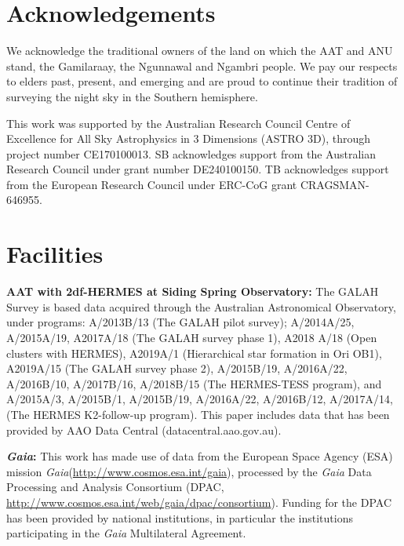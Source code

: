 \documentclass[fleqn,usenatbib]{mnras}
\newcommand{\Gaia}{\textit{Gaia}\xspace} %
\begin{document}

\section*{Acknowledgements}

We acknowledge the traditional owners of the land on which the AAT and ANU stand, the Gamilaraay, the Ngunnawal and Ngambri people. We pay our respects to elders past, present, and emerging and are proud to continue their tradition of surveying the night sky in the Southern hemisphere.

This work was supported by the Australian Research Council Centre of Excellence for All Sky Astrophysics in 3 Dimensions (ASTRO 3D), through project number CE170100013. SB acknowledges support from the Australian Research Council under grant number DE240100150. TB acknowledges support from the European Research Council under ERC-CoG grant CRAGSMAN-646955.

\section*{Facilities}

\textbf{AAT with 2df-HERMES at Siding Spring Observatory:}
The GALAH Survey is based data acquired through the Australian Astronomical Observatory, under programs: A/2013B/13 (The GALAH pilot survey); A/2014A/25, A/2015A/19, A2017A/18 (The GALAH survey phase 1), A2018 A/18 (Open clusters with HERMES), A2019A/1 (Hierarchical star formation in Ori OB1), A2019A/15 (The GALAH survey phase 2), A/2015B/19, A/2016A/22, A/2016B/10, A/2017B/16, A/2018B/15 (The HERMES-TESS program), and A/2015A/3, A/2015B/1, A/2015B/19, A/2016A/22, A/2016B/12, A/2017A/14, (The HERMES K2-follow-up program). This paper includes data that has been provided by AAO Data Central (datacentral.aao.gov.au).

\textbf{\Gaia: } This work has made use of data from the European Space Agency (ESA) mission \Gaia (\url{http://www.cosmos.esa.int/gaia}), processed by the \Gaia Data Processing and Analysis Consortium (DPAC, \url{http://www.cosmos.esa.int/web/gaia/dpac/consortium}). Funding for the DPAC has been provided by national institutions, in particular the institutions participating in the \Gaia Multilateral Agreement. 
\end{document}
